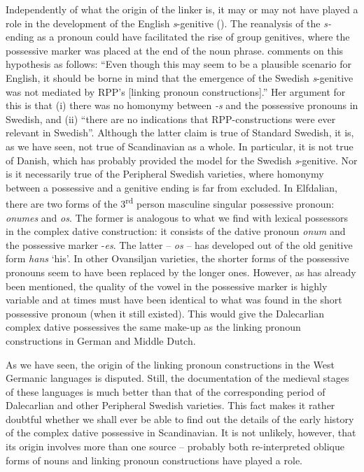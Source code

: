 \begin{styleBodytextC}
Independently of what the origin of the linker is, it may or may not have played a role in the development of the English \textit{s}{}-genitive (\citet{Janda1980}). The reanalysis of the \textit{s-}ending as a pronoun could have facilitated the rise of group genitives, where the possessive marker was placed at the end of the noun phrase. \citet[91]{Norde1997} comments on this hypothesis as follows: “Even though this may seem to be a plausible scenario for English, it should be borne in mind that the emergence of the Swedish \textit{s}{}-genitive was not mediated by RPP’s [linking pronoun constructions].” Her argument for this is that (i) there was no homonymy between\textit{ -s} and the possessive pronouns in Swedish, and (ii) “there are no indications that RPP-constructions were ever relevant in Swedish”. Although the latter claim is true of Standard Swedish, it is, as we have seen, not true of Scandinavian as a whole. In particular, it is not true of Danish, which has probably provided the model for the Swedish \textit{s}{}-genitive. Nor is it necessarily true of the Peripheral Swedish varieties, where homonymy between a possessive and a genitive ending is far from excluded. In Elfdalian, there are two forms of the 3\textsuperscript{rd} person masculine singular possessive pronoun: \textit{onumes} and \textit{os}. The former is analogous to what we find with lexical possessors in the complex dative construction: it consists of the dative pronoun \textit{onum} and the possessive marker \nobreakdash-\textit{es}. The latter – \textit{os} – has developed out of the old genitive form \textit{hans} ‘his’. In other Ovansiljan varieties, the shorter forms of the possessive pronouns seem to have been replaced by the longer ones. However, as has already been mentioned, the quality of the vowel in the possessive marker is highly variable and at times must have been identical to what was found in the short possessive pronoun (when it still existed). This would give the Dalecarlian complex dative possessives the same make-up as the linking pronoun constructions in German and Middle Dutch. 

\end{styleBodytextC}

\begin{styleBodytextC}
As we have seen, the origin of the linking pronoun constructions in the West Germanic languages is disputed. Still, the documentation of the medieval stages of these languages is much better than that of the corresponding period of Dalecarlian and other Peripheral Swedish varieties. This fact makes it rather doubtful whether we shall ever be able to find out the details of the early history of the complex dative possessive in Scandinavian. It is not unlikely, however, that its origin involves more than one source – probably both re-interpreted oblique forms of nouns and linking pronoun constructions have played a role. 

\end{styleBodytextC}

